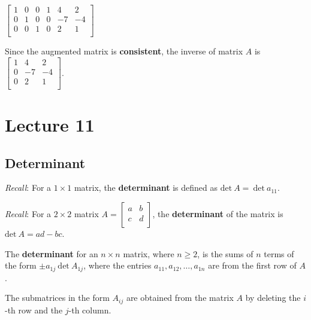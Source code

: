 \documentclass[12pt, letterpaper]{article}
\begin{document}
\begin{enumerate}
{      $
      \begin{bmatrix}
        1 & 0 & 0 & 1 & 4 & 2 \\
        0 & 1 & 0 & 0 & -7 & -4 \\
        0 & 0 & 1 & 0 & 2 & 1 \\
      \end{bmatrix} $

    }
    \medskip

    Since the augmented matrix is \textbf{consistent}, the inverse of
    matrix $ A $ is $
    \begin{bmatrix}
      1 & 4 & 2 \\
      0 & -7 & -4 \\
      0 & 2 & 1 \\
    \end{bmatrix} $.
\end{enumerate}

\section*{Lecture 11}

\subsection*{Determinant}

\textit{Recall}: For a $ 1 \times 1 $ matrix, the
\textbf{determinant} is defined as $ \textrm{det} \: A = \:
\textrm{det} \: a_{11} $.
\bigskip

\textit{Recall}: For a $ 2 \times 2 $ matrix $ A =
\begin{bmatrix}
  a & b \\
  c & d \\
\end{bmatrix} $, the \textbf{determinant} of the matrix is $
\textrm{det} \: A = ad - bc $.
\bigskip

The \textbf{determinant} for an $ n \times n $ matrix, where $ n \geq
2 $, is the sums of $ n $ terms of the form $ \pm a_{1j} \:
\textrm{det} \: A_{1j} $, where the entries $ a_{11}, a_{12}, \hdots,
a_{1n} $ are from the first row of $ A $.
\medskip

The submatrices in the form $ A_{ij} $ are obtained from the matrix $
A $ by deleting the $ i $-th row and the $ j $-th column.
\end{document}
